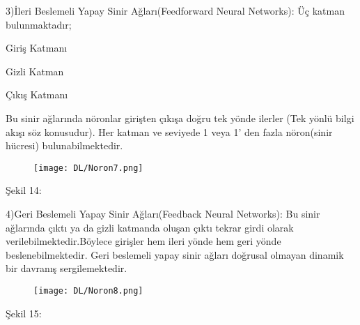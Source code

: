 \documentclass{beamer}                                                                                          %
\begin{document}

	\begin{frame}
	    \justifying
	    \color{myred1}
	        3)İleri Beslemeli Yapay Sinir Ağları(Feedforward Neural Networks):\color{black} \newline Üç katman bulunmaktadır;\par \vspace{10}

                \color{myred1} \color{black}Giriş Katmanı \par \vspace{5}
                \color{myred1} \color{black}Gizli Katman \par \vspace{5}
                \color{myred1} \color{black}Çıkış Katmanı \par \vspace{10}
            Bu sinir ağlarında nöronlar girişten çıkışa doğru tek yönde ilerler (Tek yönlü bilgi akışı söz konusudur). Her katman ve seviyede 1 veya 1’ den fazla nöron(sinir hücresi) bulunabilmektedir.
    \end{frame}
    
  
    \begin{frame}
        \begin{figure}
            \centering
            \texttt{[image: DL/Noron7.png]}
        \end{figure}\newline\centering
        \color{myred1}Şekil 14:\color{black}
    \end{frame}
    

	\begin{frame}
	    \justifying
	    \color{myred1}
	        4)Geri Beslemeli Yapay Sinir Ağları(Feedback Neural Networks):\color{black} \newline 
            Bu sinir ağlarında çıktı ya da gizli katmanda oluşan çıktı tekrar girdi olarak verilebilmektedir.Böylece girişler hem ileri yönde hem geri yönde beslenebilmektedir.
            Geri beslemeli yapay sinir ağları doğrusal olmayan dinamik bir davranış sergilemektedir.
                \begin{figure}
                    \centering
                    \texttt{[image: DL/Noron8.png]}
                \end{figure}
                \newline \centering
                \color{myred1}Şekil 15:\color{black}
    \end{frame}
    
\end{document}
